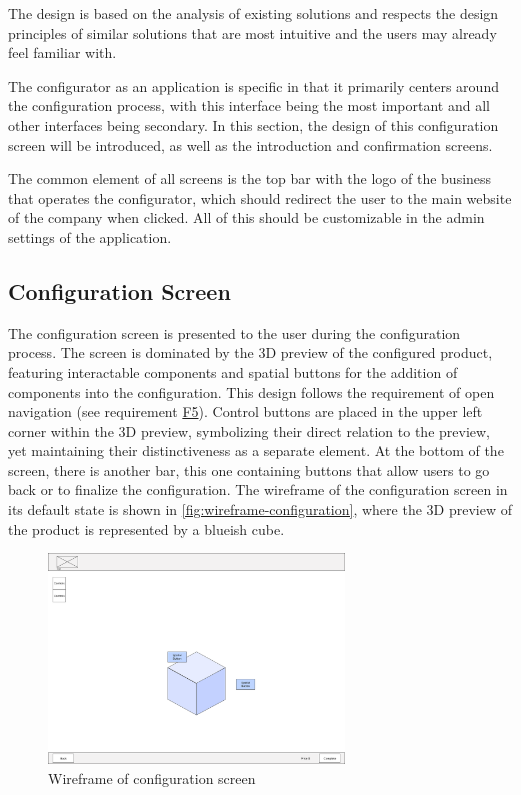The design is based on the analysis of existing solutions and respects the design principles of similar solutions that are most intuitive and the users may already feel familiar with.

The configurator as an application is specific in that it primarily centers around the configuration process, with this interface being the most important and all other interfaces being secondary. In this section, the design of this configuration screen will be introduced, as well as the introduction and confirmation screens.

The common element of all screens is the top bar with the logo of the business that operates the configurator, which should redirect the user to the main website of the company when clicked. All of this should be customizable in the admin settings of the application.

\subsection{Configuration Screen}

The configuration screen is presented to the user during the configuration process. The screen is dominated by the 3D preview of the configured product, featuring interactable components and spatial buttons for the addition of components into the configuration. This design follows the requirement of open navigation (see requirement \hyperref[itm:F5]{F5}). Control buttons are placed in the upper left corner within the 3D preview, symbolizing their direct relation to the preview, yet maintaining their distinctiveness as a separate element. At the bottom of the screen, there is another bar, this one containing buttons that allow users to go back or to finalize the configuration. The wireframe of the configuration screen in its default state is shown in  \autoref{fig:wireframe-configuration}, where the 3D preview of the product is represented by a blueish cube.

\begin{figure}[h]
\centering
\includegraphics[width=0.7\textwidth]{images/wireframe_configuration_default.png}
\caption{Wireframe of configuration screen}
\label{fig:wireframe-configuration}
\end{figure}

